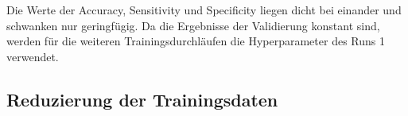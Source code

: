 \begin{table}[H]
    \centering
  \caption{Die fünf Runs mit dem niedrigsten validation loss sowie deren verwendete Hyperparameter und aufgezeichnete Metriken.}
  \label{tab:hyperp notu-tu}
\end{table}
Die Werte der Accuracy, Sensitivity und Specificity liegen dicht bei einander und schwanken nur geringfügig.
Da die Ergebnisse der Validierung konstant sind, werden für die weiteren Trainingsdurchläufen die Hyperparameter des Runs 1 verwendet. 

\subsection{Reduzierung der Trainingsdaten}

